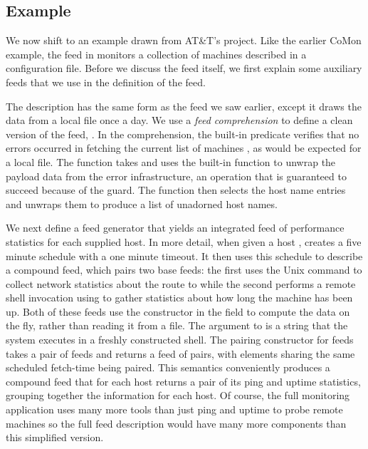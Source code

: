 \subsection{\vizGems{} Example}
We now shift to an example drawn from AT\&T's \vizGems{} project.  Like
the earlier CoMon example, the  feed in 
monitors a collection of machines described in a configuration file.
Before we discuss the  feed itself, we first explain some
auxiliary feeds that we use in the definition of the  feed.   

The  description has the same form as the 
feed we saw earlier, except it draws the data from a local file once a
day.  We use a \textit{feed comprehension} to define a clean
version of the feed, .  In the comprehension, the
built-in predicate  verifies that no errors occurred in
fetching the current list of machines , as would be expected
for a local file.  The function  takes  and uses
the built-in function  to unwrap the payload data from
the error infrastructure, an operation that is guaranteed to succeed
because of the  guard. The function  then
selects the host name entries and unwraps them to produce a list of
unadorned host names.   

We next define a feed generator  that yields an
integrated feed of performance statistics for each supplied host.  In
more detail, when given a host ,  creates a five
minute schedule with a one minute timeout. It then uses this schedule
to describe a compound feed, which pairs two base feeds: the first
uses the Unix command  to collect network statistics about
the route to  while the second performs a remote shell
invocation using  to gather statistics about how long the
machine has been up.  Both of these feeds use the 
constructor in the  field to compute the data on the fly,
rather than reading it from a file.  The argument to  is a
string that the system executes in a freshly constructed shell.  The
pairing constructor for feeds takes a pair of feeds and returns a feed
of pairs, with elements sharing the same scheduled fetch-time being
paired. This semantics conveniently produces a compound feed that for
each host returns a pair of its ping and uptime statistics, grouping
together the information for each host.  Of course, the full
\vizGems{} monitoring application uses many more tools than just ping
and uptime to probe remote machines so the full feed description would have
many more components than this simplified version. 


